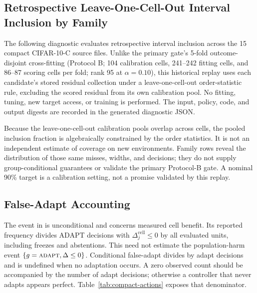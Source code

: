 \subsection{Retrospective Leave-One-Cell-Out Interval Inclusion by Family}
\label{app:interval-groups}

The following diagnostic evaluates retrospective interval inclusion across the 15 compact CIFAR-10-C source files. Unlike the primary gate's 5-fold outcome-disjoint cross-fitting (Protocol B; 104 calibration cells, 241--242 fitting cells, and 86--87 scoring cells per fold; rank 95 at $\alpha=0.10$), this historical replay uses each candidate's stored residual collection under a leave-one-cell-out order-statistic rule, excluding the scored residual from its own calibration pool. No fitting, tuning, new target access, or training is performed. The input, policy, code, and output digests are recorded in the generated diagnostic JSON.

Because the leave-one-cell-out calibration pools overlap across cells, the pooled inclusion fraction is algebraically constrained by the order statistics. It is not an independent estimate of coverage on new environments. Family rows reveal the distribution of those same misses, widths, and decisions; they do not supply group-conditional guarantees or validate the primary Protocol-B gate. A nominal 90\% target is a calibration setting, not a promise validated by this replay.

\begin{table}[t]
\centering
\scriptsize
\caption{Current-policy interval and decision diagnostics by corruption family. Width is full
interval width, $2\varepsilon$. Inclusion is measured on already-open, dependent cross-fitted cells.
Conditional errors use the number of the corresponding action as denominator and are undefined
when that action is absent. These diagnostics are not held-out group-coverage validation.}
\label{tab:interval-groups}
\resizebox{\textwidth}{!}{}
\end{table}

\subsection{False-Adapt Accounting}

The event in  is unconditional and concerns measured cell benefit.
Its reported frequency divides ADAPT decisions with $\Delta_j^{\mathrm{cell}}\le0$ by all
evaluated units, including freezes and abstentions. This need not estimate the population-harm
event $\{g=\textnormal{\textsc{adapt}},\Delta\le0\}$. Conditional false-adapt
divides by adapt decisions and is undefined when no adaptation occurs. A zero observed count should
be accompanied by the number of adapt decisions; otherwise a controller that never adapts appears
perfect. Table~\ref{tab:compact-actions} exposes that denominator.

